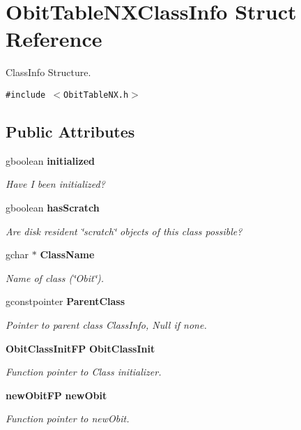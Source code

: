 \section{Obit\-Table\-NXClass\-Info Struct Reference}
\label{structObitTableNXClassInfo}
Class\-Info Structure.  


{\tt \#include $<$Obit\-Table\-NX.h$>$}

\subsection*{Public Attributes}
\begin{CompactItemize}
\item 
gboolean {\bf initialized}
\begin{CompactList}\small\item\em Have I been initialized? \item\end{CompactList}\item 
gboolean {\bf has\-Scratch}
\begin{CompactList}\small\item\em Are disk resident \char`\"{}scratch\char`\"{} objects of this class possible? \item\end{CompactList}\item 
gchar $\ast$ {\bf Class\-Name}
\begin{CompactList}\small\item\em Name of class (\char`\"{}Obit\char`\"{}). \item\end{CompactList}\item 
gconstpointer {\bf Parent\-Class}
\begin{CompactList}\small\item\em Pointer to parent class Class\-Info, Null if none. \item\end{CompactList}\item 
{\bf Obit\-Class\-Init\-FP} {\bf Obit\-Class\-Init}
\begin{CompactList}\small\item\em Function pointer to Class initializer. \item\end{CompactList}\item 
{\bf new\-Obit\-FP} {\bf new\-Obit}
\begin{CompactList}\small\item\em Function pointer to new\-Obit. \item\end{CompactList}\item 

\end{CompactItemize}
